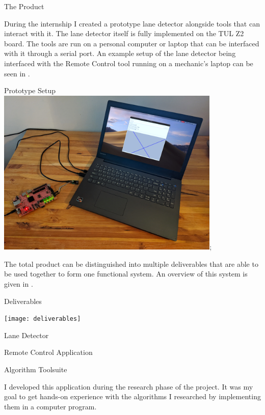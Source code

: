 \documentclass{matthijs}
\begin{document}
	\begin{hoofdstuk}{The Product}

		During the internship I created a prototype lane detector alongside tools that can interact with it.
		The lane detector itself is fully implemented on the TUL Z2 board.
		The tools are run on a personal computer or laptop that can be interfaced with it through a serial port.
		An example setup of the lane detector being interfaced with the Remote Control tool running on a mechanic's laptop can be seen in .

		\begin{figuur}{Prototype Setup}
			\includegraphics[width=0.8\textwidth]{product-5.png};
		\end{figuur}

		The total product can be distinguished into multiple deliverables that are able to be used together to form one functional system.
		An overview of this system is given in .

		\begin{figuur}{Deliverables}
			\vspace{2ex}
			\centerline{
				\texttt{[image: deliverables]}
			}
		\end{figuur}

		\begin{paragraaf}{Lane Detector}

		\end{paragraaf}

		\begin{paragraaf}{Remote Control Application}

		\end{paragraaf}

		\begin{paragraaf}{Algorithm Toolsuite}

			I developed this application during the research phase of the project.
			It was my goal to get hands-on experience with the algorithms I researched by implementing them in a computer program.

		\end{paragraaf}

	\end{hoofdstuk}
	
\end{document}
